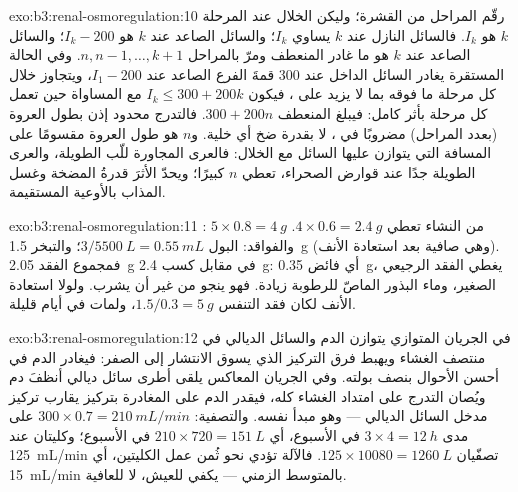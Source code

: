 \begin{solution}{exo:b3:renal-osmoregulation:10}
رقّم المراحل من القشرة؛ وليكن الخلال عند المرحلة $k$ هو
$I_{k}$. فالسائل النازل عند $k$ يساوي $I_{k}$؛ والسائل الصاعد
عند $k$ هو $I_{k} - 200$؛ والسائل الصاعد عند $k$ هو ما غادر
المنعطف ومرّ بالمراحل $n, n-1, \dots, k+1$. وفي الحالة
المستقرة يغادر السائل الداخل عند \qty{300}{} قمةَ الفرع
الصاعد عند $I_{1} - 200$، ويتجاوز خلال كل مرحلة ما فوقه بما
لا يزيد على ، فيكون $I_{k} \le 300 + 200k$ مع
المساواة حين تعمل كل مرحلة بأثر كامل: فيبلغ المنعطف $300 + 200n$.
فالتدرج محدود إذن بطول العروة (بعدد المراحل) مضروبًا في
، لا بقدرة ضخ أي خلية. و$n$ هو طول العروة مقسومًا
على المسافة التي يتوازن عليها السائل مع الخلال: فالعرى
المجاورة للّب الطويلة، والعرى الطويلة جدًا عند قوارض الصحراء،
تعطي $n$ كبيرًا؛ ويحدّ الأثرَ قدرةُ المضخة وغسل المذاب
بالأوعية المستقيمة.
\end{solution}

\begin{solution}{exo:b3:renal-osmoregulation:11}
: $5\times 0.8 = \qty{4}{g}$ من النشاء تعطي $4\times 0.6
= \qty{2.4}{g}$. والفواقد: البول $3/5500\ \unit{L} = \qty{0.55}{mL}$؛
والتبخر \qty{1.5}{g} (وهي صافية بعد استعادة الأنف). فمجموع
الفقد \qty{2.05}{g} في مقابل كسب \qty{2.4}{g}: أي فائض
\qty{0.35}{g}، يغطي الفقد الرجيعي الصغير، وماء البذور الماصّ
للرطوبة زيادة. فهو ينجو من غير أن يشرب. ولولا استعادة الأنف
لكان فقد التنفس $1.5/0.3 = \qty{5}{g}$، ولمات في أيام قليلة.
\end{solution}

\begin{solution}{exo:b3:renal-osmoregulation:12}
في الجريان المتوازي يتوازن الدم والسائل الديالي في منتصف
الغشاء ويهبط فرق التركيز الذي يسوق الانتشار إلى الصفر:
فيغادر الدم في أحسن الأحوال بنصف بولته. وفي الجريان المعاكس
يلقى أطرى سائل ديالي أنظفَ دم ويُصان التدرج على امتداد
الغشاء كله، فيقدر الدم على المغادرة بتركيز يقارب تركيز مدخل
السائل الديالي --- وهو مبدأ  نفسه. والتصفية:
$300\times 0.7 =
\qty{210}{mL/min}$ على مدى $3\times 4 = \qty{12}{h}$ في الأسبوع، أي
$210\times 720 = \qty{151}{L}$ في الأسبوع؛ وكليتان عند
\qty{125}{mL/min} تصفّيان $125\times\num{10080} = \qty{1260}{L}$.
فالآلة تؤدي نحو ثُمن عمل الكليتين، أي \qty{15}{mL/min} بالمتوسط
الزمني --- يكفي للعيش، لا للعافية.
\end{solution}

